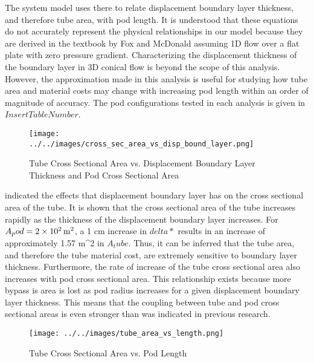 The system model uses there to relate displacement boundary layer thickness, and therefore tube area, with pod length. It is understood that these equations do not accurately represent the physical relationships in our model because they are derived in the textbook by Fox and McDonald assuming 1D flow over a flat plate with zero pressure gradient. Characterizing the displacement thickness of the boundary layer in 3D conical flow is beyond the scope of this analysis. However, the approximation made in this analysis is useful for studying how tube area and material costs may change with increasing pod length within an order of magnitude of accuracy.  The pod configurations tested in each analysis is given in $Insert Table Number$.
\begin{table}
	\centering
	\caption{Configuratoins in boundary layer sensitivity study}
	\label{tbl:boundary_layer_sensitivty_configs}
\end{table}
\begin{figure}
	\centering
	\caption{Tube Cross Sectional Area vs. Displacement Boundary Layer Thickness and Pod Cross Sectional Area}
	\label{fig:cross_sec_area_vs_disp_boundary_layer}
	\texttt{[image: ../../images/cross\_sec\_area\_vs\_disp\_bound\_layer.png]}
\end{figure}
 indicated the effects that displacement boundary layer has on the cross sectional area of the tube. It is shown that the cross sectional area of the tube increases rapidly as the thickness of the displacement boundary layer increases. For $A_pod = \SI{2d2}{\m\squared}$, a 1 cm increase in $delta*$ results in an increase of approximately 1.57 m^2 in $A_tube$. Thus, it can be inferred that the tube area, and therefore the tube material cost, are extremely sensitive to boundary layer thickness. Furthermore, the rate of increase of the tube cross sectional area also increases with pod cross sectional area. This relationship exists because more bypass is area is lost as pod radius increases for a given displacement boundary layer thickness. This means that the coupling between tube and pod cross sectional areas is even stronger than was indicated in previous research.
\begin{figure}
	\centering
	\caption{Tube Cross Sectional Area vs. Pod Length}
	\label{fig:tube_area_vs_length}
	\texttt{[image: ../../images/tube\_area\_vs\_length.png]}
\end{figure}
